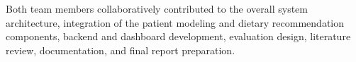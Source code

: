 {\begin{minipage}[b][0.5\textheight][t]{\textwidth}
        \vspace{0.2in}

        Both team members collaboratively contributed to the
        overall system architecture, integration of the patient
        modeling and dietary recommendation components, backend
        and dashboard development, evaluation design, literature
        review, documentation, and final report preparation.
    \end{minipage}
}
